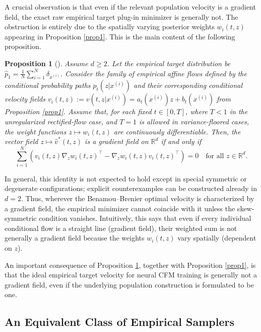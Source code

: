 \documentclass[a4paper,11pt]{article}
\newcommand{\R}{\mathbb{R}}
\theoremstyle{plain}
\newtheorem{propositioninner}[theoreminner]{Proposition}
\theoremstyle{definition}
\newenvironment{proposition}[1][]
  {\begin{mdframed}[style=propositionstyle]\begin{propositioninner}[#1]}
  {\end{propositioninner}\end{mdframed}}
\begin{document}
A crucial observation is that even if the relevant population velocity is a gradient field, the exact raw empirical target plug-in minimizer is generally not. The obstruction is entirely due to the spatially varying posterior weights $w_i(t,z)$ appearing in Proposition \ref{prop1}. This is the main content of the following proposition.

    \begin{proposition} \label{prop2}
    Assume \(d\ge2\).
    Let the empirical target distribution be $\hat{p}_1 = \frac{1}{N} \sum_{i=1}^N \delta_{x^{(i)}}$. Consider the family of empirical affine flows defined by the conditional probability paths $p_t(z|x^{(i)})$ and their corresponding conditional velocity fields $v_i(t,z) := v(t, z| x^{(i)}) = a_t(x^{(i)}) z + b_t(x^{(i)})$ from Proposition \ref{prop1}. Assume that, for each fixed \(t\in[0,T]\), where \(T<1\) in the unregularized rectified-flow case, and \(T=1\) is allowed in variance-floored cases, the weight functions $z\mapsto w_i(t,z)$ are continuously differentiable. Then, the vector field $z\mapsto \hat{v}^*(t, z)$ is a gradient field on $\R^d$ if and only if
$$\sum_{i=1}^N \left( v_i(t, z) \nabla_z w_i(t, z)^\top - \nabla_z w_i(t, z) v_i(t, z)^\top \right) = 0 \quad \text{for all } z\in\R^d.$$

    \end{proposition}



In general, this identity is not expected to hold except in special symmetric or degenerate
configurations; explicit counterexamples can be constructed already in \(d=2\). Thus, wherever the Benamou--Brenier optimal velocity is characterized by a gradient field, the empirical minimizer cannot coincide with it unless the skew-symmetric condition vanishes. Intuitively, this says that even if every individual conditional flow is a straight line (gradient field), their weighted sum is not generally a gradient field because the weights $w_i(t,z)$ vary spatially (dependent on $z$).

An important consequence of Proposition \ref{prop2}, together with Proposition \ref{prop1}, is that the ideal empirical target velocity for neural CFM training is generally not a gradient field, even if the underlying population construction is formulated to be one.

\subsection{An Equivalent Class of Empirical Samplers}
\label{subsec:flux_equiv}
\end{document}
